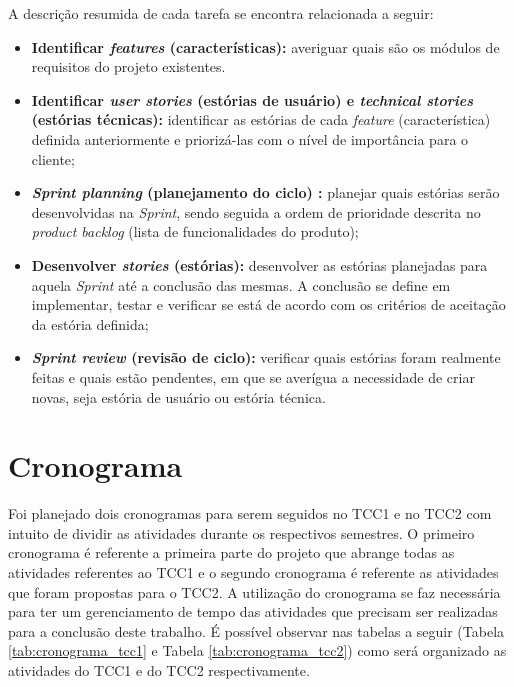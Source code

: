 A descrição resumida de cada tarefa se encontra relacionada a seguir:

\begin{itemize}
    \item \textbf{Identificar \textit{features} (características):} averiguar quais são os módulos de requisitos do projeto existentes.
    
    \item \textbf{Identificar \textit{user stories} (estórias de usuário) e \textit{technical stories} (estórias técnicas):} identificar as estórias de cada \textit{feature} (característica) definida anteriormente e priorizá-las com o nível de importância para o cliente;
    
    \item \textbf{\textit{Sprint planning} (planejamento do ciclo) :} planejar quais estórias serão desenvolvidas na \textit{Sprint}, sendo seguida a ordem de prioridade descrita no \textit{product backlog} (lista de funcionalidades do produto);
    
    \item \textbf{Desenvolver \textit{stories} (estórias):} desenvolver as estórias planejadas para aquela \textit{Sprint} até a conclusão das mesmas. A conclusão se define em implementar, testar e verificar se está de acordo com os critérios de aceitação da estória definida;
    
    \item \textbf{\textit{Sprint review} (revisão de ciclo):} verificar quais estórias foram realmente feitas e quais estão pendentes, em que se averígua a necessidade de criar novas, seja estória de usuário ou estória técnica.
\end{itemize}

\section{Cronograma}

Foi planejado dois cronogramas para serem seguidos no TCC1 e no TCC2 com intuito de dividir as atividades durante os respectivos semestres. O primeiro cronograma é referente a primeira parte do projeto que abrange todas as atividades referentes ao TCC1 e o segundo cronograma é referente as atividades que foram propostas para o TCC2. A utilização do cronograma se faz necessária para ter um gerenciamento de tempo das atividades que precisam ser realizadas para a conclusão deste trabalho. É possível observar nas tabelas a seguir (Tabela \ref{tab:cronograma_tcc1} e Tabela \ref{tab:cronograma_tcc2}) como será organizado as atividades do TCC1 e do TCC2 respectivamente.

